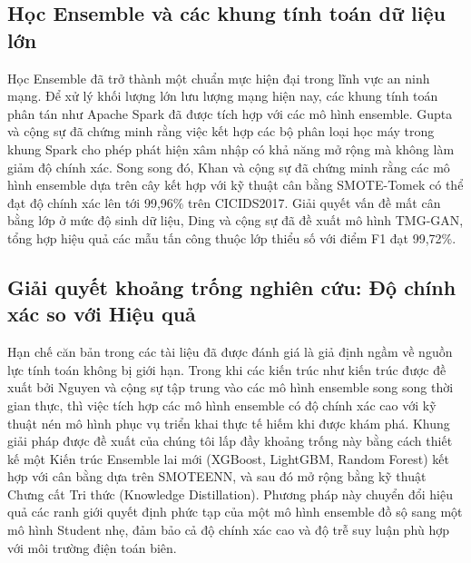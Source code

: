 \subsection{Học Ensemble và các khung tính toán dữ liệu lớn}
Học Ensemble đã trở thành một chuẩn mực hiện đại trong lĩnh vực an ninh mạng. Để xử lý khối lượng lớn lưu lượng mạng hiện nay, các khung tính toán phân tán như Apache Spark \cite{zaharia2010spark} đã được tích hợp với các mô hình ensemble. Gupta và cộng sự \cite{gupta2022big} đã chứng minh rằng việc kết hợp các bộ phân loại học máy trong khung Spark cho phép phát hiện xâm nhập có khả năng mở rộng mà không làm giảm độ chính xác. Song song đó, Khan và cộng sự \cite{khan2024balanced} đã chứng minh rằng các mô hình ensemble dựa trên cây kết hợp với kỹ thuật cân bằng SMOTE-Tomek có thể đạt độ chính xác lên tới 99,96\% trên CICIDS2017. Giải quyết vấn đề mất cân bằng lớp ở mức độ sinh dữ liệu, Ding và cộng sự \cite{ding2024tmg} đã đề xuất mô hình TMG-GAN, tổng hợp hiệu quả các mẫu tấn công thuộc lớp thiểu số với điểm F1 đạt 99,72\%.

\subsection{Giải quyết khoảng trống nghiên cứu: Độ chính xác so với Hiệu quả}
Hạn chế căn bản trong các tài liệu đã được đánh giá là giả định ngầm về nguồn lực tính toán không bị giới hạn. Trong khi các kiến trúc như kiến trúc được đề xuất bởi Nguyen và cộng sự \cite{nguyen2024apelid} tập trung vào các mô hình ensemble song song thời gian thực, thì việc tích hợp các mô hình ensemble có độ chính xác cao với kỹ thuật nén mô hình phục vụ triển khai thực tế hiếm khi được khám phá. Khung giải pháp được đề xuất của chúng tôi lấp đầy khoảng trống này bằng cách thiết kế một Kiến trúc Ensemble lai mới (XGBoost, LightGBM, Random Forest) kết hợp với cân bằng dựa trên SMOTEENN, và sau đó mở rộng bằng kỹ thuật Chưng cất Tri thức (Knowledge Distillation). Phương pháp này chuyển đổi hiệu quả các ranh giới quyết định phức tạp của một mô hình ensemble đồ sộ sang một mô hình Student nhẹ, đảm bảo cả độ chính xác cao và độ trễ suy luận phù hợp với môi trường điện toán biên.
